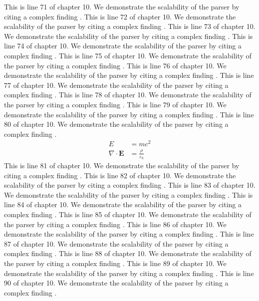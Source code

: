This is line 71 of chapter 10. We demonstrate the scalability of the parser by citing a complex finding \cite{ref10_71}.
This is line 72 of chapter 10. We demonstrate the scalability of the parser by citing a complex finding \cite{ref10_72}.
This is line 73 of chapter 10. We demonstrate the scalability of the parser by citing a complex finding \cite{ref10_73}.
This is line 74 of chapter 10. We demonstrate the scalability of the parser by citing a complex finding \cite{ref10_74}.
This is line 75 of chapter 10. We demonstrate the scalability of the parser by citing a complex finding \cite{ref10_75}.
This is line 76 of chapter 10. We demonstrate the scalability of the parser by citing a complex finding \cite{ref10_76}.
This is line 77 of chapter 10. We demonstrate the scalability of the parser by citing a complex finding \cite{ref10_77}.
This is line 78 of chapter 10. We demonstrate the scalability of the parser by citing a complex finding \cite{ref10_78}.
This is line 79 of chapter 10. We demonstrate the scalability of the parser by citing a complex finding \cite{ref10_79}.
This is line 80 of chapter 10. We demonstrate the scalability of the parser by citing a complex finding \cite{ref10_80}.
\begin{align*}
  E &= mc^2 \\
  \nabla \cdot \mathbf{E} &= \frac{\rho}{\varepsilon_0}
\end{align*}
This is line 81 of chapter 10. We demonstrate the scalability of the parser by citing a complex finding \cite{ref10_81}.
This is line 82 of chapter 10. We demonstrate the scalability of the parser by citing a complex finding \cite{ref10_82}.
This is line 83 of chapter 10. We demonstrate the scalability of the parser by citing a complex finding \cite{ref10_83}.
This is line 84 of chapter 10. We demonstrate the scalability of the parser by citing a complex finding \cite{ref10_84}.
This is line 85 of chapter 10. We demonstrate the scalability of the parser by citing a complex finding \cite{ref10_85}.
This is line 86 of chapter 10. We demonstrate the scalability of the parser by citing a complex finding \cite{ref10_86}.
This is line 87 of chapter 10. We demonstrate the scalability of the parser by citing a complex finding \cite{ref10_87}.
This is line 88 of chapter 10. We demonstrate the scalability of the parser by citing a complex finding \cite{ref10_88}.
This is line 89 of chapter 10. We demonstrate the scalability of the parser by citing a complex finding \cite{ref10_89}.
This is line 90 of chapter 10. We demonstrate the scalability of the parser by citing a complex finding \cite{ref10_90}.
